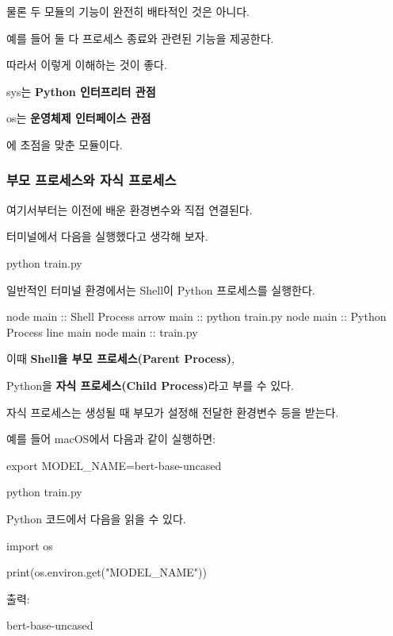 물론 두 모듈의 기능이 완전히 배타적인 것은 아니다.

예를 들어 둘 다 프로세스 종료와 관련된 기능을 제공한다.

따라서 이렇게 이해하는 것이 좋다.

\begin{dhksmry}[centered]
sys는 \textbf{Python 인터프리터 관점}

os는 \textbf{운영체제 인터페이스 관점}
\end{dhksmry}

에 초점을 맞춘 모듈이다.

\subsubsection{부모 프로세스와 자식 프로세스}

여기서부터는 이전에 배운 환경변수와 직접 연결된다.

터미널에서 다음을 실행했다고 생각해 보자.

\begin{dhkzsh}
python train.py
\end{dhkzsh}

일반적인 터미널 환경에서는 Shell이 Python 프로세스를 실행한다.

\begin{dhkbranch}
node main :: Shell Process
arrow main :: python train.py
node main :: Python Process
line main
node main :: train.py
\end{dhkbranch}

이때 \textbf{Shell을 부모 프로세스(Parent Process)},

Python을 \textbf{자식 프로세스(Child Process)}라고 부를 수 있다.

자식 프로세스는 생성될 때 부모가 설정해 전달한 환경변수 등을 받는다.

예를 들어 macOS에서 다음과 같이 실행하면:

\begin{dhkzsh}
export MODEL_NAME=bert-base-uncased

python train.py
\end{dhkzsh}

Python 코드에서 다음을 읽을 수 있다.

\begin{dhkcode}
import os

print(os.environ.get("MODEL_NAME"))
\end{dhkcode}

출력:

\begin{dhkzsh}
bert-base-uncased
\end{dhkzsh}

